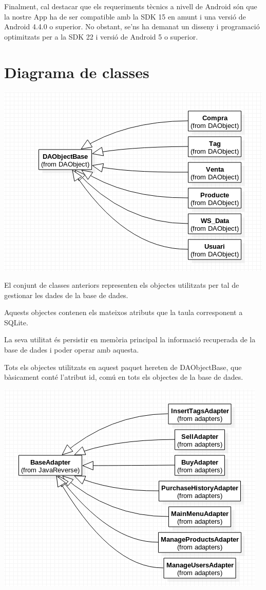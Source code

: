 \documentclass{article}[]
\begin{document}
Finalment, cal destacar que els requeriments tècnics a nivell de Android són que la nostre App ha de ser compatible amb la SDK 15 en amunt i una versió de Android 4.4.0 o superior. No obstant, se'ns ha demanat un disseny i programació optimitzats per a la SDK 22 i versió de Android 5 o superior. 


\section{Diagrama de classes}

\begin{center}
	\includegraphics[scale=0.5]{img/1.png}
	 \end{center}
		El conjunt de classes anteriors representen els objectes utilitzats per tal de gestionar les dades de la base de dades.

Aquests objectes contenen els mateixos atributs que la taula corresponent a SQLite.

La seva utilitat és persistir en memòria principal la informació recuperada de la base de dades i poder operar amb aquesta.

Tots els objectes utilitzats en aquest paquet hereten de DAObjectBase, que bàsicament conté l'atribut id, comú en tots els objectes de la base de dades.
	\begin{center}
	\includegraphics[scale=0.5]{img/2.png}
	 \end{center}
	 
\end{document}
